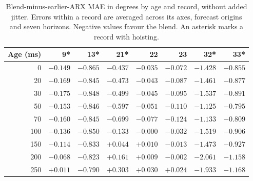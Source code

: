 \begin{table}[H]
\centering\small
\caption{Blend-minus-earlier-ARX MAE in degrees by age and record, without added jitter. Errors within a record are averaged across its axes, forecast origins and seven horizons. Negative values favour the blend. An asterisk marks a record with hoisting.}
\label{tab:record-gaps}
\begin{tabular}{@{}rrrrrrrr@{}}
\toprule
Age (ms) & 9* & 13* & 21* & 22 & 23 & 32* & 33* \\
\midrule
0 & $-0.149$ & $-0.865$ & $-0.437$ & $-0.035$ & $-0.072$ & $-1.428$ & $-0.855$ \\
20 & $-0.169$ & $-0.845$ & $-0.473$ & $-0.043$ & $-0.087$ & $-1.461$ & $-0.877$ \\
30 & $-0.175$ & $-0.848$ & $-0.499$ & $-0.045$ & $-0.095$ & $-1.537$ & $-0.891$ \\
50 & $-0.153$ & $-0.846$ & $-0.597$ & $-0.051$ & $-0.110$ & $-1.125$ & $-0.795$ \\
70 & $-0.160$ & $-0.845$ & $-0.699$ & $-0.077$ & $-0.124$ & $-1.133$ & $-0.809$ \\
100 & $-0.136$ & $-0.850$ & $-0.133$ & $-0.000$ & $-0.032$ & $-1.519$ & $-0.906$ \\
150 & $-0.114$ & $-0.833$ & $+0.044$ & $+0.010$ & $-0.013$ & $-1.473$ & $-0.927$ \\
200 & $-0.068$ & $-0.823$ & $+0.161$ & $+0.009$ & $-0.002$ & $-2.061$ & $-1.158$ \\
250 & $+0.011$ & $-0.790$ & $+0.303$ & $+0.030$ & $+0.024$ & $-1.933$ & $-1.168$ \\
\bottomrule
\end{tabular}
\end{table}
